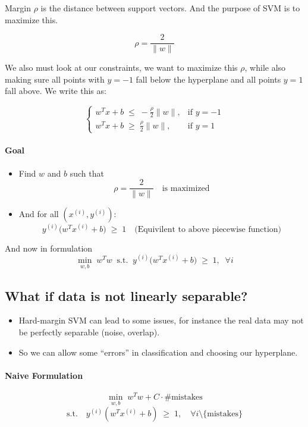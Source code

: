 \documentclass[11pt]{article}
\begin{document}
Margin $\rho$ is the distance between support vectors. And the purpose of SVM is to maximize this.

\[
\rho = \frac{2}{\|w\|}
\]

We also must look at our constraints, we want to maximize this $\rho$, while also making sure all points with $y=-1$ fall below the hyperplane and all points $y=1$ fall above. We write this as:

\[
\begin{cases}
w^T x + b \;\leq\; -\tfrac{\rho}{2}\|w\|, & \text{if } y = -1 \\[6pt]
w^T x + b \;\geq\; \tfrac{\rho}{2}\|w\|, & \text{if } y = 1
\end{cases}
\]

\paragraph{Goal}
\begin{itemize}
    \item Find $w$ and $b$ such that
    \[
    \rho = \frac{2}{\|w\|} \quad \text{is maximized}
    \]
    \item And for all $(x^{(i)}, y^{(i)})$:
    \[
    y^{(i)} \big(w^T x^{(i)} + b\big) \;\geq\; 1 \quad \text{(Equivilent to above piecewise function)}
    \]
\end{itemize}

And now in formulation
\[
 \min_{w,b} \; w^Tw \; \; \text{s.t.} \; \; y^{(i)} \big(w^T x^{(i)} + b\big) \;\geq\; 1, 
\; \; \forall i
\]

\subsection*{What if data is not linearly separable?}

\begin{itemize}
    \item Hard-margin SVM can lead to some issues, for instance the real data may not be perfectly separable (noise, overlap).
    \item So we can allow some ``errors'' in classification and choosing our hyperplane.
\end{itemize}

\paragraph*{Naive Formulation}
\[
\min_{w,b} \; w^T w + C \cdot \#\text{mistakes}
\]
\[
\text{s.t.} \quad y^{(i)}(w^T x^{(i)} + b) \;\geq\; 1, \quad \forall i \setminus \{\text{mistakes}\}
\]
\end{document}
